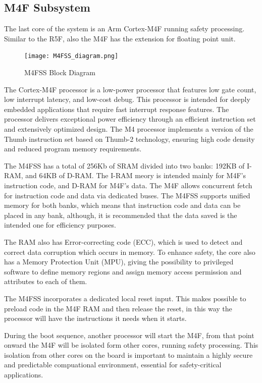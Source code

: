 \subsection{M4F Subsystem}

The last core of the system is an Arm Cortex-M4F running safety processing.
Similar to the R5F, also the M4F has the extension for floating point unit.

\begin{figure}[ht]
    \centering
    \texttt{[image: M4FSS\_diagram.png]}
    \caption{M4FSS Block Diagram}
\end{figure}

The Cortex-M4F processor is a low-power processor that features low gate count,
low interrupt latency, and low-cost debug. This processor is intended for
deeply embedded applications that require fast interrupt response features.
\cite{M4F_technical_reference}
The processor delivers exceptional power efficiency through an efficient
instruction set and extensively optimized design. The M4 processor implements
a version of the Thumb instruction set based on Thumb-2 technology, ensuring
high code density and reduced program memory requirements.

The M4FSS has a total of 256Kb of SRAM divided into two banks: 192KB of I-RAM,
and 64KB of D-RAM. The I-RAM meory is intended mainly for M4F's instruction
code, and D-RAM for M4F's data. The M4F allows concurrent fetch for instruction
code and data via dedicated buses.
The M4FSS supports unified memory for both banks, which means that instruction
code and data can be placed in any bank, although, it is recommended that
the data saved is the intended one for efficiency purposes.

The RAM also has Error-correcting code (ECC), which is used to detect and
correct data corruption which occurs in memory.
To enhance safety, the core also has a Memory Protection Unit (MPU), giving
the possibility to privileged software to define memory regions and assign
memory access permission and attributes to each of them.

The M4FSS incorporates a dedicated local reset input. This makes possible to
preload code in the M4F RAM and then release the reset, in this way the
processor will have the instructions it needs when it starts.

During the boot sequence, another processor will start the M4F, from that point
onward the M4F will be isolated form other cores, running safety processing.
This isolation from other cores on the board is important to maintain a highly
secure and predictable compuational environment, essential for safety-critical
applications.

